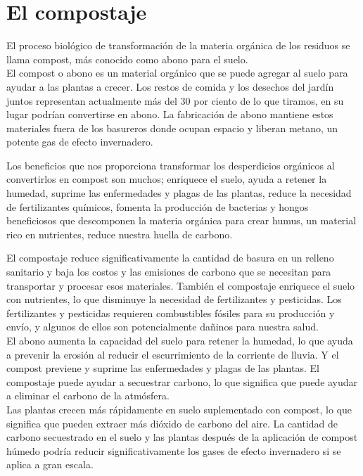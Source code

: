\documentclass[../main.tex]{subfiles}
\begin{document}
\chapter{El compostaje}

El proceso biológico de transformación de la materia orgánica de los residuos se llama compost, más conocido como abono para el suelo. \\
El compost o abono es un material orgánico que se puede agregar al suelo para ayudar a las plantas a crecer. Los restos de comida y los desechos del jardín juntos representan actualmente más del 30 por ciento de lo que tiramos, en su lugar podrían convertirse en abono. La fabricación de abono mantiene estos materiales fuera de los basureros donde ocupan espacio y liberan metano, un potente gas de efecto invernadero.\\

\begin{recuadroV}
    Los beneficios que nos proporciona transformar los desperdicios orgánicos al convertirlos en compost son muchos; enriquece el suelo, ayuda a retener la humedad, suprime las enfermedades y plagas de las plantas, reduce la necesidad de fertilizantes químicos, fomenta la producción de bacterias y hongos beneficiosos que descomponen la materia orgánica para crear humus, un material rico en nutrientes, reduce nuestra huella de carbono.
\end{recuadroV}

El compostaje reduce significativamente la cantidad de basura en un relleno sanitario y baja los costos y las emisiones de carbono que se necesitan para transportar y procesar esos materiales. 
También el compostaje enriquece el suelo con nutrientes, lo que disminuye la necesidad de fertilizantes y pesticidas. Los fertilizantes y pesticidas requieren combustibles fósiles para su producción y envío, y algunos de ellos son potencialmente dañinos para nuestra salud.\\

El abono aumenta la capacidad del suelo para retener la humedad, lo que ayuda a prevenir la erosión al reducir el escurrimiento de la corriente de lluvia. Y el compost previene y suprime las enfermedades y plagas de las plantas.
El compostaje puede ayudar a secuestrar carbono, lo que significa que puede ayudar a eliminar el carbono de la atmósfera.\\

Las plantas crecen más rápidamente en suelo suplementado con compost, lo que significa que pueden extraer más dióxido de carbono del aire. La cantidad de carbono secuestrado en el suelo y las plantas después de la aplicación de compost húmedo podría reducir significativamente los gases de efecto invernadero si se aplica a gran escala.
\end{document}
